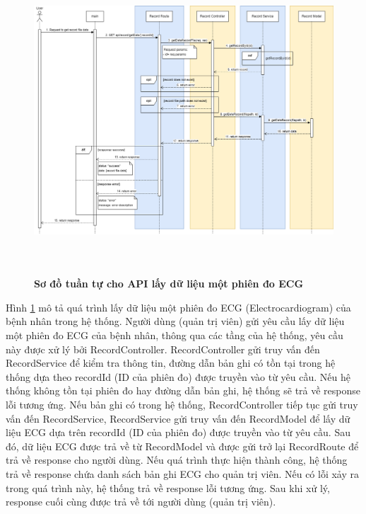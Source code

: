  \begin{figure}[H]
  \centering
  \includegraphics[width=16cm,height=11.5cm]{Images/sequence_api/getRecordDataById.png}
  \caption[Sơ đồ tuần tự cho API lấy dữ liệu một phiên đo ECG ]{\bfseries \fontsize{12pt}{0pt}
  \selectfont Sơ đồ tuần tự cho API lấy dữ liệu một phiên đo ECG }
  \label{api_getRecordDataById} %
\end{figure}
Hình \ref{api_getRecordDataById} mô tả quá trình lấy dữ liệu một phiên đo ECG (Electrocardiogram) của bệnh nhân trong hệ thống. Người dùng (quản trị viên) gửi yêu cầu lấy dữ liệu một phiên đo ECG của bệnh nhân, thông qua các tầng của hệ thống, 
yêu cầu này được xử lý bởi RecordController. RecordController gửi truy vấn đến RecordService để kiểm tra thông tin, đường dẫn bản ghi có tồn tại trong hệ thống dựa theo recordId (ID của phiên đo) được truyền vào từ yêu cầu. Nếu hệ thống không tồn tại phiên đo hay đường dẫn bản ghi, hệ thống sẽ
trả về response lỗi tương ứng. Nếu bản ghi có trong hệ thống, RecordController tiếp tục gửi truy vấn đến RecordService, RecordService gửi truy vấn đến RecordModel để lấy dữ liệu ECG dựa trên recordId (ID của phiên đo) được truyền vào từ yêu cầu. 
Sau đó, dữ liệu ECG được trả về từ RecordModel và được gửi trở lại RecordRoute để trả về response cho người dùng. Nếu quá trình thực hiện thành công, hệ thống trả về response chứa danh sách bản ghi ECG cho quản trị viên. Nếu có lỗi xảy ra
 trong quá trình này, hệ thống trả về response lỗi tương ứng. Sau khi xử lý, response cuối cùng được trả về tới người dùng (quản trị viên).


